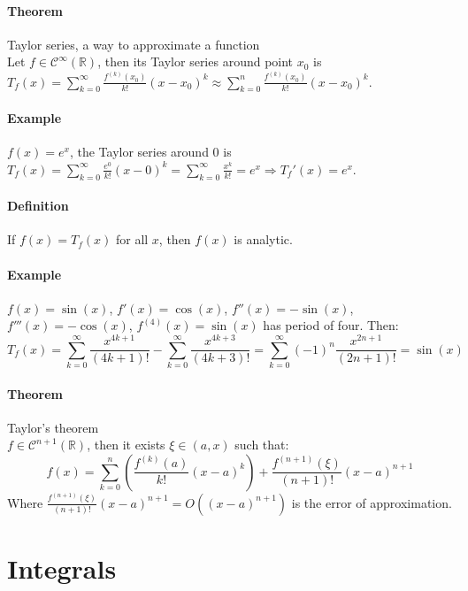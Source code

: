 \documentclass{article}
\newcommand{\DS}{\displaystyle}
\newcommand{\intoo}[1]{\left(#1\right)}
\newcommand{\R}{\mathbb{R}}
\newcommand{\C}{\mathcal{C}}
\newcommand{\Def}{\paragraph{Definition}}
\newcommand{\Theorem}{\paragraph{Theorem}}
\newcommand{\Example}{\paragraph{Example}}
\begin{document}
  \Theorem Taylor series, a way to approximate a function
\\Let $f \in \C^\infty(\R)$, then its Taylor series around point $x_0$ is
  $\DS T_f(x) = \sum_{k=0}^\infty \frac{f^{(k)}(x_0)}{k!}(x-x_0)^k \approx
  \sum_{k=0}^n \frac{f^{(k)}(x_0)}{k!}(x-x_0)^k$.

  \Example $f(x) = e^x$, the Taylor series around 0 is $\DS T_f(x) =
  \sum_{k=0}^\infty \frac{e^0}{k!}(x-0)^k = \sum_{k=0}^\infty \frac{x^k}{k!} =
  e^x \Rightarrow T_f'(x) = e^x$.

  \Def If $f(x) = T_f(x)$ for all $x$, then $f(x)$ is analytic.

  \Example $f(x) = \sin(x)$, $f'(x) = \cos(x)$, $f''(x) = -\sin(x)$, $f'''(x) =
  -\cos(x)$, $f^{(4)}(x) = \sin(x)$ has period of four. Then:
  \begin{equation*}
    T_f(x) =
    \sum_{k=0}^\infty \frac{x^{4k+1}}{(4k+1)!} -
    \sum_{k=0}^\infty \frac{x^{4k+3}}{(4k+3)!} =
    \sum_{k=0}^\infty (-1)^n \frac{x^{2n+1}}{(2n+1)!} = \sin(x)
  \end{equation*}

  \Theorem Taylor's theorem
\\$f \in \C^{n+1}(\R)$, then it exists $\xi \in \intoo{a,x}$ such that:
  \begin{equation*}
    f(x) =
    \sum_{k=0}^n \left( \frac{f^{(k)}(a)}{k!}(x-a)^k \right) +
    \frac{f^{(n+1)}(\xi)}{(n+1)!}(x-a)^{n+1}
  \end{equation*}
  Where $\frac{f^{(n+1)}(\xi)}{(n+1)!}(x-a)^{n+1} = O((x-a)^{n+1})$ is the error
  of approximation.

\section{Integrals}
\end{document}

